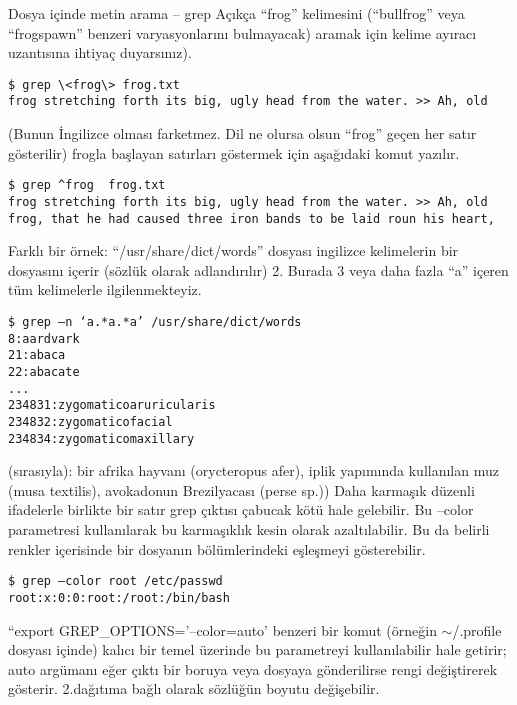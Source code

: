 \begin{section}{Dosya içinde metin arama – grep}
Açıkça “frog” kelimesini (“bullfrog” veya “frogspawn” benzeri  varyasyonlarını bulmayacak) aramak için kelime ayıracı uzantısına ihtiyaç duyarsınız).

\begin{verbatim}
$ grep \<frog\> frog.txt
frog stretching forth its big, ugly head from the water. >> Ah, old
\end{verbatim}

(Bunun İngilizce olması farketmez. Dil ne olursa olsun “frog” geçen her satır gösterilir) frogla başlayan satırları göstermek için aşağıdaki komut yazılır.
\begin{verbatim}
$ grep ^frog  frog.txt
frog stretching forth its big, ugly head from the water. >> Ah, old
frog, that he had caused three iron bands to be laid roun his heart,
\end{verbatim}

Farklı bir örnek: “/usr/share/dict/words” dosyası ingilizce kelimelerin bir dosyasını içerir (sözlük olarak adlandırılır) 2. Burada 3 veya daha fazla “a”  içeren tüm kelimelerle ilgilenmekteyiz.

\begin{verbatim}
$ grep –n ‘a.*a.*a’ /usr/share/dict/words
8:aardvark
21:abaca
22:abacate
...
234831:zygomaticoaruricularis
234832:zygomaticofacial
234834:zygomaticomaxillary
\end{verbatim}

(sırasıyla): bir afrika hayvanı (orycteropus afer), iplik yapımında kullanılan muz (musa textilis), avokadonun Brezilyacası (perse sp.)) Daha karmaşık düzenli ifadelerle birlikte bir satır grep çıktısı çabucak kötü hale gelebilir. Bu –color parametresi kullanılarak bu karmaşıklık kesin olarak azaltılabilir. Bu da belirli renkler içerisinde bir dosyanın bölümlerindeki eşleşmeyi gösterebilir.
\begin{verbatim}
$ grep –color root /etc/passwd
root:x:0:0:root:/root:/bin/bash
\end{verbatim}

“export GREP\_OPTIONS='--color=auto' benzeri bir komut (örneğin $\sim$/.profile dosyası içinde) kalıcı bir temel üzerinde bu parametreyi kullanılabilir hale getirir; auto argümanı eğer çıktı bir boruya veya dosyaya gönderilirse rengi değiştirerek gösterir. 2.dağıtıma bağlı olarak sözlüğün boyutu değişebilir.


\end{section}
